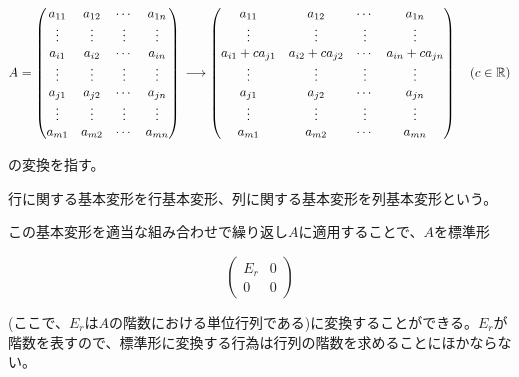 \documentclass[dvipdfmx,autodetect-engine]{jsarticle}
\begin{document}
\begin{enumerate}
$$
A = \begin{pmatrix}
a_{11} & a_{12} & \cdots & a_{1n} \\
\vdots & \vdots & \vdots & \vdots \\
a_{i1} & a_{i2} & \cdots & a_{in} \\
\vdots & \vdots & \vdots & \vdots \\
a_{j1} & a_{j2} & \cdots & a_{jn} \\
\vdots & \vdots & \vdots & \vdots \\
a_{m1} & a_{m2} & \cdots & a_{mn} \\
\end{pmatrix} \\
\longrightarrow \begin{pmatrix}
a_{11} & a_{12} & \cdots & a_{1n} \\
\vdots & \vdots & \vdots & \vdots \\
a_{i1} + ca_{j1} & a_{i2} + ca_{j2} & \cdots & a_{in} + ca_{jn} \\
\vdots & \vdots & \vdots & \vdots \\
a_{j1} & a_{j2} & \cdots & a_{jn} \\
\vdots & \vdots & \vdots & \vdots \\
a_{m1} & a_{m2} & \cdots & a_{mn} \\
\end{pmatrix} \quad (c \in \mathbb{R})
$$

の変換を指す。
\end{enumerate}

行に関する基本変形を行基本変形、列に関する基本変形を列基本変形という。

この基本変形を適当な組み合わせで繰り返し$A$に適用することで、$A$を標準形

$$
\begin{pmatrix}
E_r & 0 \\
0 & 0
\end{pmatrix}
$$


(ここで、$E_r$は$A$の階数における単位行列である)に変換することができる。$E_r$が階数を表すので、標準形に変換する行為は行列の階数を求めることにほかならない。


\end{document}
